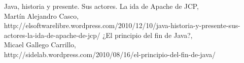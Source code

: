 \documentclass[11pt]{scrartcl}
\begin{document}
\begin{thebibliography}{9}

        Java, historia y presente. Sus actores. La ida de Apache de JCP,\\
        Martín Alejandro Casco,\\
        http://elsoftwarelibre.wordpress.com/2010/12/10/java-historia-y-presente-sus-actores-la-ida-de-apache-de-jcp/
        ¿El principio del fin de Java?,\\
        Micael Gallego Carrillo,\\
        http://sidelab.wordpress.com/2010/08/16/el-principio-del-fin-de-java/
\end{thebibliography}
\end{document}
